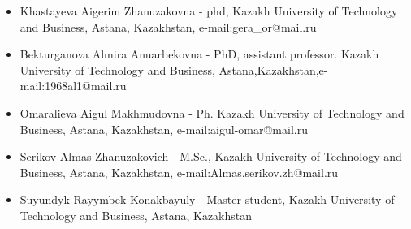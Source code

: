 \begin{itemize}
\item
Khastayeva Aigerim Zhanuzakovna - phd, Kazakh University of Technology
and Business, Astana, Kazakhstan, e-mail:gera\_or@mail.ru

\item
Bekturganova Almira Anuarbekovna - PhD, assistant professor. Kazakh
University of Technology and Business,
Astana,Kazakhstan,e-mail:1968al1@mail.ru

\item
Omaralieva Aigul Makhmudovna - Ph. Kazakh University of Technology and
Business, Astana, Kazakhstan, e-mail:aigul-omar@mail.ru

\item
Serikov Almas Zhanuzakovich - M.Sc., Kazakh University of Technology and
Business, Astana, Kazakhstan, e-mail:Almas.serikov.zh@mail.ru

\item
Suyundyk Rayymbek Konakbayuly - Master student, Kazakh University of
Technology and Business, Astana, Kazakhstan
\end{itemize}
